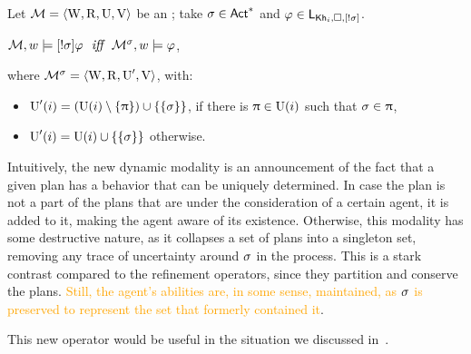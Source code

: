 \begin{definition}\label{def:srefsemantics}
Let $\mathcal{M} = \langle \operatorname{W}, \operatorname{R}, \operatorname{U}, \operatorname{V} \rangle$ be an \ults; take $\sigma \in {\rm \sf Act}^*$ and $\varphi \in \mathsf{L}_{{\sf Kh}_i,\square,[!\sigma]}$.
\begin{spcenter}
$\mathcal{M},w \models [!\sigma]\varphi \ \ \mbox{\it iff} \ \ \mathcal{M}^\sigma,w \models \varphi$,
\end{spcenter}
where $\mathcal{M}^\sigma = \langle \operatorname{W},\operatorname{R},\operatorname{U}',\operatorname{V} \rangle$, with:
\begin{itemize}
\item $\operatorname{U}'(i) = (\operatorname{U}(i) \setminus \{ \uppi \}) \cup \{ \{ \sigma \} \}$, if there is $\uppi \in \operatorname{U}(i)$ such that $\sigma \in \uppi$,
\item $\operatorname{U}'(i) = \operatorname{U}(i) \cup \{ \{ \sigma \} \}$ otherwise.

\end{itemize}
\end{definition}

\medskip

Intuitively, the new dynamic modality is an announcement of the fact that a given plan has a behavior that can be uniquely determined. In case the plan is not a part of the plans that are under the consideration of a certain agent, it is added to it, making the agent aware of its existence. Otherwise, this modality has some destructive nature, as it collapses a set of plans into a singleton set, removing any trace of uncertainty around $\sigma$ in the process. This is a stark contrast compared to the refinement operators, since they partition and conserve the plans. \textcolor{orange}{Still, the agent's abilities are, in some sense, maintained, as $\sigma$ is preserved to represent the set that formerly contained it}.

\medskip

This new operator would be useful in the situation we discussed in~.

\medskip 


